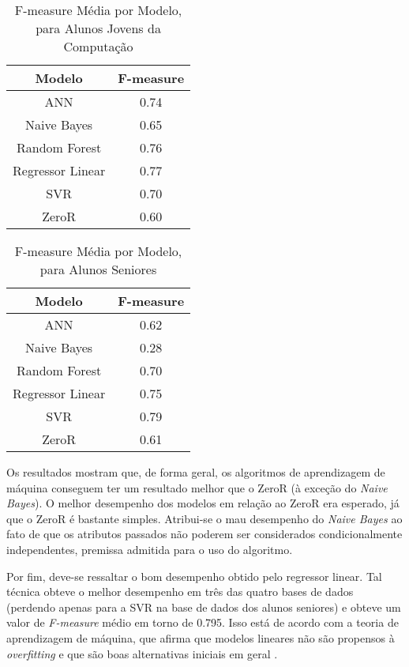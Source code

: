 \begin{table}
\caption{F-measure Média por Modelo, para Alunos Jovens da Computação}
\begin{center}
\begin{tabular}[c]{| c | c |}
    \hline
    \textbf{Modelo} & \textbf{F-measure} \\
    \hline
    ANN              & 0.74 \\
    \hline
    Naive Bayes      & 0.65 \\
    \hline
    Random Forest    & 0.76 \\
    \hline
    Regressor Linear & 0.77 \\
    \hline
    SVR              & 0.70 \\
    \hline
    ZeroR            & 0.60 \\
    \hline
\end{tabular}
\end{center}
\label{fmeasure_comp}
\end{table}

\begin{table}
\caption{F-measure Média por Modelo, para Alunos Seniores}
\begin{center}
\begin{tabular}[c]{| c | c |}
    \hline
    \textbf{Modelo} & \textbf{F-measure} \\
    \hline
    ANN              & 0.62 \\
    \hline
    Naive Bayes      & 0.28 \\
    \hline
    Random Forest    & 0.70 \\
    \hline
    Regressor Linear & 0.75 \\
    \hline
    SVR              & 0.79 \\
    \hline
    ZeroR            & 0.61 \\
    \hline
\end{tabular}
\end{center}
\label{fmeasure_old}
\end{table}

\par Os resultados mostram que, de forma geral, os algoritmos de aprendizagem de máquina
conseguem ter um resultado melhor que o ZeroR (à exceção do \textit{Naive Bayes}). O melhor
desempenho dos modelos em relação ao ZeroR era esperado, já que o ZeroR é bastante
simples. Atribui-se o mau desempenho do \textit{Naive Bayes} ao
fato de que os atributos passados não poderem ser considerados condicionalmente
independentes, premissa admitida para o uso do algoritmo. 
\par Por fim, deve-se ressaltar o bom desempenho obtido pelo regressor linear. Tal
técnica obteve o melhor desempenho em três das quatro bases de dados (perdendo apenas
para a SVR na base de dados dos alunos seniores) e obteve um valor de
\textit{F-measure} médio em torno de 0.795. Isso está de acordo com a teoria de
aprendizagem de máquina, que afirma que modelos lineares não são propensos à
\textit{overfitting} e que são boas alternativas iniciais em geral
\cite{ml_second_book}. 
